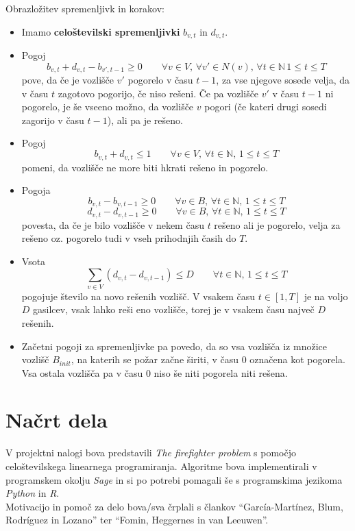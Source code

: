 \documentclass[a4paper, 11pt]{article}
\begin{document}
\noindent Obrazložitev spremenljivk in korakov:
\begin{itemize}
    \item Imamo \textbf{celoštevilski spremenljivki} $b_{v,t}$ in $d_{v,t}$.
    \item Pogoj $$b_{v,t} + d_{v,t} - b_{v',t-1} \ge 0 \qquad \forall v \in V ,\, \forall v' \in N(v) ,\, \forall t \in \mathbb{N} \, 1 \le t \le T $$
    pove, da če je vozlišče $v'$ pogorelo v času $t-1$, za vse njegove sosede velja, da v času $t$  zagotovo pogorijo, če 
    niso rešeni. Če pa vozlišče $v'$ v času $t-1$ ni pogorelo, je še vseeno možno, da 
    vozlišče $v$ pogori (če kateri drugi sosedi zagorijo v času $t-1$), ali pa je rešeno.
    \item Pogoj $$b_{v,t} + d_{v,t} \le 1 \qquad \forall v \in V ,\, \forall t \in \mathbb{N} ,\, 1 \le t \le T$$
    pomeni, da vozlišče ne more biti hkrati rešeno in pogorelo.
    \item Pogoja $$b_{v,t} - b_{v,t-1} \ge 0 \qquad \forall v \in B ,\, \forall t \in \mathbb{N} ,\, 1 \le t \le T$$
    $$d_{v,t} - d_{v,t-1} \ge 0 \qquad \forall v \in B ,\, \forall t \in \mathbb{N} ,\, 1 \le t \le T$$
    povesta, da če je bilo vozlišče v nekem času $t$ rešeno ali je pogorelo, velja za rešeno oz. pogorelo tudi v vseh prihodnjih časih do $T$.
    \item Vsota $$\sum_{v \in V}{\left( d_{v,t} - d_{v, t-1} \right)} \le D \qquad \forall t \in \mathbb{N} ,\, 1 \le t \le T$$
    pogojuje število na novo rešenih vozlišč. V vsakem času $t \in  [1, T]$ je na voljo $D$ gasilcev, vsak lahko reši
    eno vozlišče, torej je v vsakem času največ $D$ rešenih. 
    \item  Začetni pogoji za spremenljivke pa povedo, da so vsa vozlišča iz množice vozlišč $B_{init}$, na 
    katerih se požar začne širiti, v času $0$ označena kot pogorela. 
    Vsa ostala vozlišča pa v času $0$ niso še niti pogorela niti rešena. \\
\end{itemize}

\section{Načrt dela}

\noindent V projektni nalogi bova predstavili \emph{The firefighter problem} s pomočjo
celoštevilskega linearnega programiranja. Algoritme bova implementirali
v programskem okolju \emph{Sage} in si po potrebi pomagali še s programskima
jezikoma \emph{Python} in \emph{R}. \\
Motivacijo in pomoč za delo bova/sva črplali s člankov ``García-Martínez, Blum, Rodríguez in Lozano''\cite{garcia2015} ter
``Fomin, Heggernes in van Leeuwen''\cite{fomin2015}. \\




\end{document}
